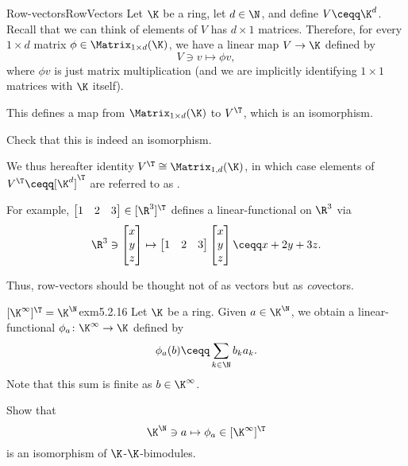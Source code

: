\begin{exm}{Row-vectors}{RowVectors}
	Let $\K$ be a ring, let $d\in \N$, and define $V\ceqq \K ^d$.  Recall that we can think of elements of $V$ has $d\times 1$ matrices.  Therefore, for every $1\times d$ matrix $\phi \in \Matrix _{1\times d}(\K )$, we have a linear map $V\rightarrow \K$ defined by
	\begin{equation}
	V\ni v\mapsto \phi v,
	\end{equation}
	where $\phi v$ is just matrix multiplication (and we are implicitly identifying $1\times 1$ matrices with $\K$ itself).
	
	This defines a map from $\Matrix _{1\times d}(\K )$ to $V^{\T}$, which is an isomorphism.
	\begin{exr}[breakable=false]{}{}
		Check that this is indeed an isomorphism.
	\end{exr}
	
	We thus hereafter identity $V^{\T}\cong \Matrix _{1,d}(\K )$, in which case elements of $V^{\T}\ceqq [\K ^d]^{\T}$ are referred to as .
	
	For example, $\begin{bmatrix}1 & 2 & 3\end{bmatrix}\in [\R ^3]^{\T}$ defines a linear-functional on $\R ^3$ via
	\begin{equation}
	\R ^3\ni \begin{bmatrix}x \\ y \\ z\end{bmatrix}\mapsto \begin{bmatrix}1 & 2 & 3\end{bmatrix}\begin{bmatrix}x \\ y \\ z\end{bmatrix}\ceqq x+2y+3z.
	\end{equation}
	\begin{rmk}
		Thus, row-vectors should be thought not of as vectors but as \emph{co}vectors.
	\end{rmk}
\end{exm}
\begin{exm}{$[\K ^{\infty}]^{\T}=\K ^{\N}$}{exm5.2.16}
	Let $\K$ be a ring.  Given $a\in \K ^{\N}$, we obtain a linear-functional $\phi _a\colon \K ^{\infty}\rightarrow \K$ defined by
	\begin{equation}
		\phi _a(b)\ceqq \sum _{k\in \N}b_ka_k.
	\end{equation}
	Note that this sum is finite as $b\in \K ^{\infty}$.
	\begin{exr}[breakable=false]{}{}
		Show that
		\begin{equation}
		\K ^{\N}\ni a\mapsto \phi _a\in [\K ^{\infty}]^{\T}
		\end{equation}
		is an isomorphism of $\K$-$\K$-bimodules.
	\end{exr}
\end{exm}


